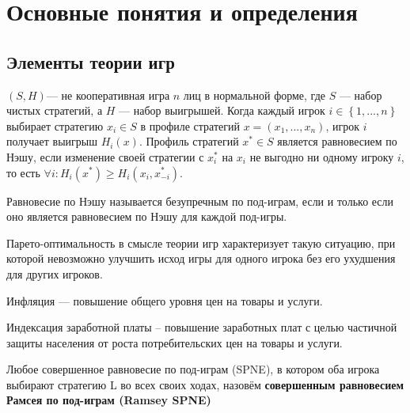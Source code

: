 \section{Основные понятия и определения}
\subsection{Элементы теории игр}

\begin{definition}	$(S,H)$— не кооперативная игра $n$ лиц в нормальной форме, где $S$ — набор чистых стратегий, а $H$ — набор выигрышей. Когда каждый игрок $i \in \left\{1,...,n\right\}$  выбирает стратегию $x_i \in S$  в профиле стратегий $x=(x_1,...,x_n)$, игрок $i$  получает выигрыш $H_i(x)$. Профиль стратегий $x^* \in S$   является равновесием по Нэшу, если изменение своей стратегии с $x_i^*$  на $x_i$  не выгодно ни одному игроку $i$, то есть $\forall i : H_i(x^*) \geqslant H_i(x_i, x_{-i}^*)$.
\end{definition}
	
\begin{definition}
Равновесие по Нэшу называется безупречным по под-играм, если и только если оно является равновесием по Нэшу для каждой под-игры.
\end{definition}

\begin{definition}
Парето-оптимальность в смысле теории игр характеризует такую ситуацию, при которой невозможно улучшить исход игры для одного игрока без его ухудшения для других игроков.
\end{definition}

\begin{definition}
	Инфляция  — повышение общего уровня цен на товары и услуги.
\end{definition}

\begin{definition}
	Индексация заработной платы – повышение заработных плат с целью частичной защиты населения от роста потребительских цен на товары и услуги.
\end{definition}

\begin{definition}
	Любое совершенное равновесие по под-играм (SPNE), в котором оба игрока выбирают стратегию L во всех своих ходах, назовём \textbf{совершенным равновесием Рамсея по под-играм (Ramsey SPNE)}~\cite{libich2008macroeconomic}
\end{definition}

